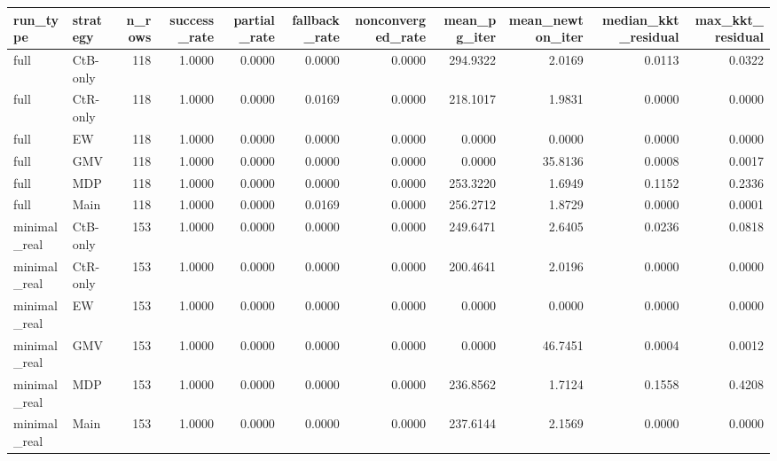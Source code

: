 \begin{tabular}{llrrrrrrrrr}
\toprule
run_type & strategy & n_rows & success_rate & partial_rate & fallback_rate & nonconverged_rate & mean_pg_iter & mean_newton_iter & median_kkt_residual & max_kkt_residual \\
\midrule
full & CtB-only & 118 & 1.0000 & 0.0000 & 0.0000 & 0.0000 & 294.9322 & 2.0169 & 0.0113 & 0.0322 \\
full & CtR-only & 118 & 1.0000 & 0.0000 & 0.0169 & 0.0000 & 218.1017 & 1.9831 & 0.0000 & 0.0000 \\
full & EW & 118 & 1.0000 & 0.0000 & 0.0000 & 0.0000 & 0.0000 & 0.0000 & 0.0000 & 0.0000 \\
full & GMV & 118 & 1.0000 & 0.0000 & 0.0000 & 0.0000 & 0.0000 & 35.8136 & 0.0008 & 0.0017 \\
full & MDP & 118 & 1.0000 & 0.0000 & 0.0000 & 0.0000 & 253.3220 & 1.6949 & 0.1152 & 0.2336 \\
full & Main & 118 & 1.0000 & 0.0000 & 0.0169 & 0.0000 & 256.2712 & 1.8729 & 0.0000 & 0.0001 \\
minimal_real & CtB-only & 153 & 1.0000 & 0.0000 & 0.0000 & 0.0000 & 249.6471 & 2.6405 & 0.0236 & 0.0818 \\
minimal_real & CtR-only & 153 & 1.0000 & 0.0000 & 0.0000 & 0.0000 & 200.4641 & 2.0196 & 0.0000 & 0.0000 \\
minimal_real & EW & 153 & 1.0000 & 0.0000 & 0.0000 & 0.0000 & 0.0000 & 0.0000 & 0.0000 & 0.0000 \\
minimal_real & GMV & 153 & 1.0000 & 0.0000 & 0.0000 & 0.0000 & 0.0000 & 46.7451 & 0.0004 & 0.0012 \\
minimal_real & MDP & 153 & 1.0000 & 0.0000 & 0.0000 & 0.0000 & 236.8562 & 1.7124 & 0.1558 & 0.4208 \\
minimal_real & Main & 153 & 1.0000 & 0.0000 & 0.0000 & 0.0000 & 237.6144 & 2.1569 & 0.0000 & 0.0000 \\
\bottomrule
\end{tabular}
